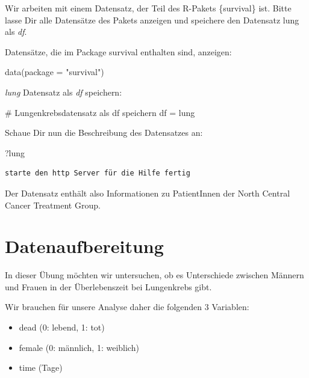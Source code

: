 \documentclass[
  letterpaper,
  DIV=11,
  numbers=noendperiod]{scrartcl}
\newenvironment{Shaded}{\begin{snugshade}}{\end{snugshade}}
\newcommand{\AttributeTok}[1]{\textcolor[rgb]{0.40,0.45,0.13}{#1}}
\newcommand{\CommentTok}[1]{\textcolor[rgb]{0.37,0.37,0.37}{#1}}
\newcommand{\FunctionTok}[1]{\textcolor[rgb]{0.28,0.35,0.67}{#1}}
\newcommand{\NormalTok}[1]{\textcolor[rgb]{0.00,0.23,0.31}{#1}}
\newcommand{\OtherTok}[1]{\textcolor[rgb]{0.00,0.23,0.31}{#1}}
\newcommand{\StringTok}[1]{\textcolor[rgb]{0.13,0.47,0.30}{#1}}
\providecommand{\tightlist}{%
  \setlength{\itemsep}{0pt}\setlength{\parskip}{0pt}}\usepackage{longtable,booktabs,array}
\begin{document}
Wir arbeiten mit einem Datensatz, der Teil des R-Pakets \{survival\}
ist. Bitte lasse Dir alle Datensätze des Pakets anzeigen und speichere
den Datensatz lung als \emph{df}.

Datensätze, die im Package survival enthalten sind, anzeigen:

\begin{Shaded}
\begin{Highlighting}[]
\FunctionTok{data}\NormalTok{(}\AttributeTok{package =} \StringTok{"survival"}\NormalTok{)}
\end{Highlighting}
\end{Shaded}

\emph{lung} Datensatz als \emph{df} speichern:

\begin{Shaded}
\begin{Highlighting}[]
\CommentTok{\# Lungenkrebsdatensatz als df speichern }
\NormalTok{df }\OtherTok{=}\NormalTok{ lung}
\end{Highlighting}
\end{Shaded}

Schaue Dir nun die Beschreibung des Datensatzes an:

\begin{Shaded}
\begin{Highlighting}[]
\NormalTok{?lung}
\end{Highlighting}
\end{Shaded}

\begin{verbatim}
starte den http Server für die Hilfe fertig
\end{verbatim}

Der Datensatz enthält also Informationen zu PatientInnen der North
Central Cancer Treatment Group.

\section{Datenaufbereitung}\label{datenaufbereitung}

In dieser Übung möchten wir untersuchen, ob es Unterschiede zwischen
Männern und Frauen in der Überlebenszeit bei Lungenkrebs gibt.

Wir brauchen für unsere Analyse daher die folgenden 3 Variablen:

\begin{itemize}
\tightlist
\item
  dead (0: lebend, 1: tot)
\item
  female (0: männlich, 1: weiblich)
\item
  time (Tage)
\end{itemize}
\end{document}
